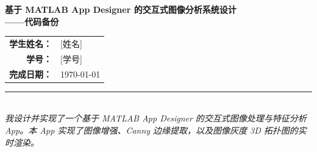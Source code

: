 \documentclass[UTF8, a4paper, 11pt]{ctexart}
\begin{document}
\begin{titlepage}
    \begin{center}
        \vspace*{2cm}
        \Huge{\textbf{基于 MATLAB App Designer 的交互式图像分析系统设计}}\\
        \vspace{0.5cm}
        \Large{\textbf{——代码备份}}\\
        \vspace{2cm}
        
        \large
        \begin{tabular}{rl}
            \textbf{学生姓名：} & [姓名] \\  %
            \textbf{学号：} & [学号] \\      %
            \textbf{完成日期：} & \today \\
        \end{tabular}
        \vspace{3cm}
        
        \rule{0.8\textwidth}{0.5pt} \\
        \vspace{0.5cm}
        \textit{我设计并实现了一个基于 MATLAB App Designer 的交互式图像处理与特征分析 App。本 App 实现了图像增强、Canny 边缘提取，以及图像灰度 3D 拓扑图的实时渲染。}
    \end{center}
\end{titlepage}
\end{document}
